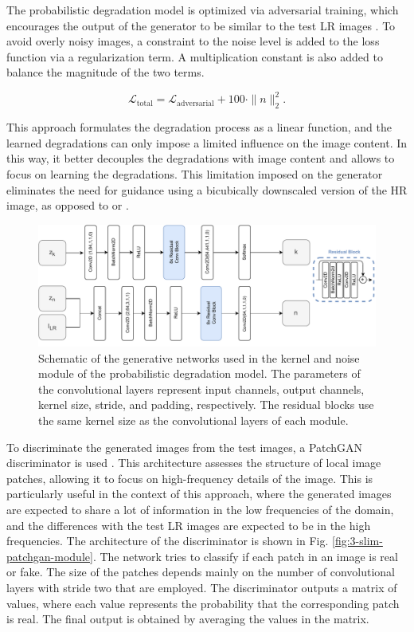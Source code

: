     The probabilistic degradation model is optimized via adversarial training, which encourages the output of the generator to be similar to the test LR images \cite{bulat2018learn}.
    To avoid overly noisy images, a constraint to the noise level is added to the loss function via a regularization term. 
    A multiplication constant is also added to balance the magnitude of the two terms.

    \begin{equation}
        \mathcal{L}_{\text{total}} = \mathcal{L}_{\text{adversarial}} + 100 \cdot \|n\|_2^2.
    \end{equation}

    This approach formulates the degradation process as a linear function, and the learned degradations can only impose a limited influence on the image content.
    In this way, it better decouples the degradations with image content and allows to focus on learning the degradations.
    This limitation imposed on the generator eliminates the need for guidance using a bicubically downscaled version of the HR image, as opposed to \cite{wei2020unsupervised} or \cite{bulat2018learn}.

    \begin{figure}[H]
        \centering
        \includegraphics[width=\textwidth]{Includes/3-slim-gen-module.pdf}
        \caption{Schematic of the generative networks used in the kernel and noise module of the probabilistic degradation model.
        The parameters of the convolutional layers represent input channels, output channels, kernel size, stride, and padding, respectively.
        The residual blocks use the same kernel size as the convolutional layers of each module.}
        \label{fig:3-slim-gen-module}
    \end{figure}

    To discriminate the generated images from the test images, a PatchGAN discriminator is used \cite{isola2018imagetoimage}. This architecture assesses the structure of local image patches, allowing it to focus on high-frequency details of the image. This is particularly useful in the context of this approach, where the generated images are expected to share a lot of information in the low frequencies of the domain, and the differences with the test  LR images are expected to be in the high frequencies. The architecture of the discriminator is shown in Fig. \ref{fig:3-slim-patchgan-module}.
    The network tries to classify if each patch in an image is real or fake. The size of the patches depends mainly on the number of convolutional layers with stride two that are employed. The discriminator outputs a matrix of values, where each value represents the probability that the corresponding patch is real. The final output is obtained by averaging the values in the matrix.

